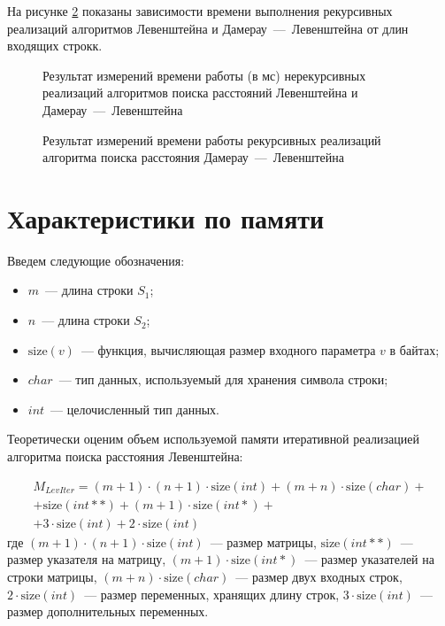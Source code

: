 На рисунке \ref{fig:plotting_data2} показаны зависимости времени выполнения рекурсивных реализаций алгоритмов Левенштейна и Дамерау~---~Левенштейна от длин входящих строкк.


\begin{figure}[H]
    
    \caption{Результат измерений времени работы (в мс) нерекурсивных реализаций алгоритмов поиска расстояний Левенштейна и Дамерау~---~Левенштейна}
    \label{fig:plotting_data1}
\end{figure}

\begin{figure}[H]
    
    \caption{Результат измерений времени работы рекурсивных реализаций алгоритма поиска расстояния Дамерау~---~Левенштейна}
    \label{fig:plotting_data2}
\end{figure}


\section{Характеристики по памяти}

Введем следующие обозначения:

\begin{itemize}
    \item $m$~--- длина строки $S_1$;
    \item $n$~--- длина строки $S_2$;
    \item $\text{size}(v)$~--- функция, вычисляющая размер входного параметра $v$ в байтах;
    \item $char$~--- тип данных, используемый для хранения символа строки;
    \item $int$~--- целочисленный тип данных.
\end{itemize}

Теоретически оценим объем используемой памяти итеративной реализацией алгоритма поиска расстояния Левенштейна:

\begin{multline}
    M_{LevIter} = (m + 1) \cdot (n + 1) \cdot \text{size}(int) + (m + n) \cdot \text{size}(char) + \\
    + \text{size}(int**) + (m + 1) \cdot \text{size}(int*) + \\
    + 3 \cdot \text{size}(int) + 2 \cdot \text{size}(int)
\end{multline}
где $(m + 1) \cdot (n + 1) \cdot \text{size}(int)$~--- размер матрицы,
\newline $\text{size}(int**)$~--- размер указателя на матрицу,
\newline $(m + 1) \cdot \text{size}(int*)$~--- размер указателей на строки матрицы,
\newline $(m + n) \cdot \text{size}(char)$~--- размер двух входных строк,
\newline $2 \cdot \text{size}(int)$~--- размер переменных, хранящих длину строк,
\newline $3 \cdot \text{size}(int)$~--- размер дополнительных переменных.

